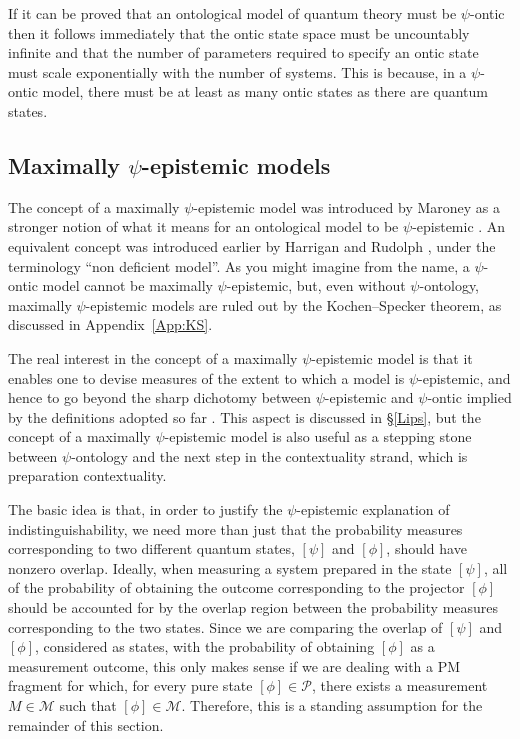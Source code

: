 \documentclass[DIV=calc,fontsize=12pt]{scrartcl} %
\theoremstyle{definition}
\theoremstyle{plain}
\newcommand{\Proj}[1]{\ensuremath{\left [ #1 \right ]}}
\begin{document}
If it can be proved that an ontological model of quantum theory must
be $\psi$-ontic then it follows immediately that the ontic state space
must be uncountably infinite and that the number of parameters
required to specify an ontic state must scale exponentially with the
number of systems.  This is because, in a $\psi$-ontic model, there
must be at least as many ontic states as there are quantum states.

\subsection{Maximally $\psi$-epistemic models}

\label{ME}

The concept of a maximally $\psi$-epistemic model was introduced by
Maroney as a stronger notion of what it means for an ontological model
to be $\psi$-epistemic \cite{Maroney2012}.  An equivalent concept was
introduced earlier by Harrigan and Rudolph \cite{Harrigan2007}, under
the terminology ``non deficient model''.  As you might imagine from
the name, a $\psi$-ontic model cannot be maximally $\psi$-epistemic,
but, even without $\psi$-ontology, maximally $\psi$-epistemic models
are ruled out by the Kochen--Specker theorem, as discussed in
Appendix~\ref{App:KS}.

The real interest in the concept of a maximally $\psi$-epistemic model
is that it enables one to devise measures of the extent to which a
model is $\psi$-epistemic, and hence to go beyond the sharp dichotomy
between $\psi$-epistemic and $\psi$-ontic implied by the definitions
adopted so far \cite{Maroney2012, Barrett2013, Leifer2014,
Branciard2014}.  This aspect is discussed in \S\ref{Lips}, but the
concept of a maximally $\psi$-epistemic model is also useful as a
stepping stone between $\psi$-ontology and the next step in the
contextuality strand, which is preparation contextuality.

The basic idea is that, in order to justify the $\psi$-epistemic
explanation of indistinguishability, we need more than just that the
probability measures corresponding to two different quantum states,
$\Proj{\psi}$ and $\Proj{\phi}$, should have nonzero overlap.
Ideally, when measuring a system prepared in the state $\Proj{\psi}$,
all of the probability of obtaining the outcome corresponding to the
projector $\Proj{\phi}$ should be accounted for by the overlap region
between the probability measures corresponding to the two states.
Since we are comparing the overlap of $\Proj{\psi}$ and $\Proj{\phi}$,
considered as states, with the probability of obtaining $\Proj{\phi}$
as a measurement outcome, this only makes sense if we are dealing with
a PM fragment for which, for every pure state $\Proj{\phi} \in
\mathcal{P}$, there exists a measurement $M \in \mathcal{M}$ such that
$\Proj{\phi} \in \mathcal{M}$.  Therefore, this is a standing
assumption for the remainder of this section.
\end{document}
